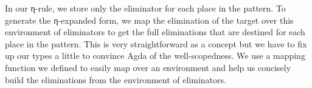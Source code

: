 In our η-rule, we store only the eliminator for each place in the pattern.
To generate the η-expanded form, we map the elimination of the target
over this environment of eliminators to get the full eliminations that
are destined for each place in the pattern. This is very straightforward
as a concept but we have to fix up our types a little to convince
Agda of the well-scopedness. We use a mapping function we defined to easily
map over an environment and help us concisely build the eliminations from
the environment of eliminators.
\begin{code}%
\>[0]\AgdaSpace{}%
\AgdaSpace{}%
\AgdaSymbol{:}\AgdaSpace{}%
\AgdaSpace{}%
\<%
\\
\>[0][@{}l@{\AgdaIndent{0}}]%
\>[2]\AgdaSpace{}%
\<%
\\
%
\\[\AgdaEmptyExtraSkip]%
%
\>[2]\<%
\\
\>[2][@{}l@{\AgdaIndent{0}}]%
\>[4]%
\>[17]\AgdaSymbol{:}%
\>[20]\<%
\\
%
\>[4]%
\>[17]\AgdaSymbol{:}%
\>[20]\AgdaSpace{}%
\AgdaSpace{}%
\<%
\\
%
\>[2]\AgdaSpace{}%
\AgdaSymbol{=}\AgdaSpace{}%
\AgdaSpace{}%
\<%
\\
%
\\[\AgdaEmptyExtraSkip]%
%
\>[2]\AgdaSpace{}%
\AgdaSymbol{:}\AgdaSpace{}%
\AgdaSymbol{(}\AgdaSpace{}%
\AgdaSpace{}%
\AgdaSymbol{:}\AgdaSpace{}%
\AgdaSpace{}%
\AgdaSymbol{)}\AgdaSpace{}%
\AgdaSpace{}%
\AgdaSymbol{(}\AgdaSpace{}%
\AgdaSpace{}%
\AgdaSymbol{)}\AgdaSpace{}%
\<%
\\
%
\>[2]\AgdaSpace{}%
\AgdaSymbol{\{}\AgdaSymbol{\}}\AgdaSpace{}%
\AgdaSpace{}%
\<%
\\
\>[2][@{}l@{\AgdaIndent{0}}]%
\>[4]\AgdaSymbol{=}%
\>[87I]\<%
\\
\>[87I][@{}l@{\AgdaIndent{0}}]%
\>[8]\AgdaSpace{}%
\AgdaSymbol{\{}\AgdaSymbol{\}}\AgdaSpace{}%

\end{code}
